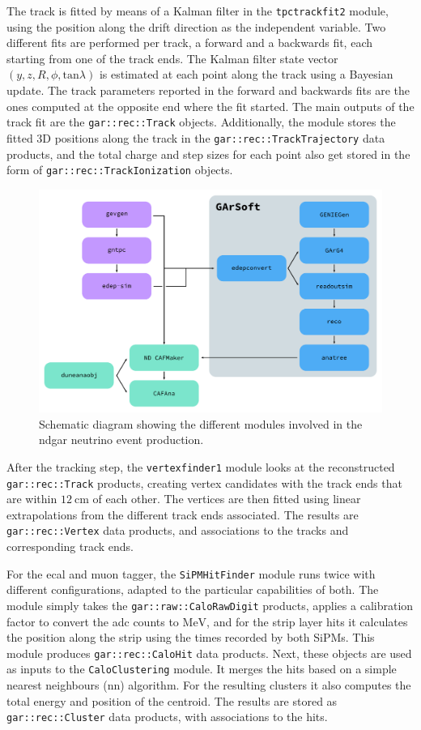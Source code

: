 The track is fitted by means of a Kalman filter in the \texttt{tpctrackfit2} module, using the position along the drift direction as the independent variable. Two different fits are performed per track, a forward and a backwards fit, each starting from one of the track ends. The Kalman filter state vector $(y,z,R,\phi,\mathrm{tan}\lambda)$ is estimated at each point along the track using a Bayesian update. The track parameters reported in the forward and backwards fits are the ones computed at the opposite end where the fit started. The main outputs of the track fit are the \texttt{gar::rec::Track} objects. Additionally, the module stores the fitted 3D positions along the track in the \texttt{gar::rec::TrackTrajectory} data products, and the total charge and step sizes for each point also get stored in the form of \texttt{gar::rec::TrackIonization} objects.

\begin{figure}[t]
	\centering
	\includegraphics[width=.90\linewidth]{Images/GArSoft_PID/gar_workflow.pdf}
	\caption{Schematic diagram showing the different modules involved in the \gls{ndgar} neutrino event production.}
	\label{fig:gar_workflow}
\end{figure}

After the tracking step, the \texttt{vertexfinder1} module looks at the reconstructed \texttt{gar::rec::Track} products, creating vertex candidates with the track ends that are within $12~\mathrm{cm}$ of each other. The vertices are then fitted using linear extrapolations from the different track ends associated. The results are \texttt{gar::rec::Vertex} data products, and associations to the tracks and corresponding track ends.

For the \gls{ecal} and muon tagger, the \texttt{SiPMHitFinder} module runs twice with different configurations, adapted to the particular capabilities of both. The module simply takes the \texttt{gar::raw::CaloRawDigit} products, applies a calibration factor to convert the \gls{adc} counts to $\mathrm{MeV}$, and for the strip layer hits it calculates the position along the strip using the times recorded by both SiPMs. This module produces \texttt{gar::rec::CaloHit} data products. Next, these objects are used as inputs to the \texttt{CaloClustering} module. It merges the hits based on a simple nearest neighbours (\gls{nn}) algorithm. For the resulting clusters it also computes the total energy and position of the centroid. The results are stored as \texttt{gar::rec::Cluster} data products, with associations to the hits.

